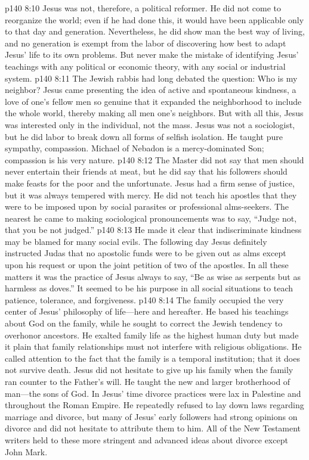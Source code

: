 \vs p140 8:10 Jesus was not, therefore, a political reformer. He did not come to reorganize the world; even if he had done this, it would have been applicable only to that day and generation. Nevertheless, he did show man the best way of living, and no generation is exempt from the labor of discovering how best to adapt Jesus’ life to its own problems. But never make the mistake of identifying Jesus’ teachings with any political or economic theory, with any social or industrial system.
\pc \vs p140 8:11 \bibnobreakspace {} The Jewish rabbis had long debated the question: Who is my neighbor? Jesus came presenting the idea of active and spontaneous kindness, a love of one’s fellow men so genuine that it expanded the neighborhood to include the whole world, thereby making all men one’s neighbors. But with all this, Jesus was interested only in the individual, not the mass. Jesus was not a sociologist, but he did labor to break down all forms of selfish isolation. He taught pure sympathy, compassion. Michael of Nebadon is a mercy\hyp{}dominated Son; compassion is his very nature.
\vs p140 8:12 The Master did not say that men should never entertain their friends at meat, but he did say that his followers should make feasts for the poor and the unfortunate. Jesus had a firm sense of justice, but it was always tempered with mercy. He did not teach his apostles that they were to be imposed upon by social parasites or professional alms\hyp{}seekers. The nearest he came to making sociological pronouncements was to say, \textcolor{ubdarkred}{“Judge not, that you be not judged.”}
\vs p140 8:13 He made it clear that indiscriminate kindness may be blamed for many social evils. The following day Jesus definitely instructed Judas that no apostolic funds were to be given out as alms except upon his request or upon the joint petition of two of the apostles. In all these matters it was the practice of Jesus always to say, \textcolor{ubdarkred}{“Be as wise as serpents but as harmless as doves.”} It seemed to be his purpose in all social situations to teach patience, tolerance, and forgiveness.
\vs p140 8:14 The family occupied the very center of Jesus’ philosophy of life---here and hereafter. He based his teachings about God on the family, while he sought to correct the Jewish tendency to overhonor ancestors. He exalted family life as the highest human duty but made it plain that family relationships must not interfere with religious obligations. He called attention to the fact that the family is a temporal institution; that it does not survive death. Jesus did not hesitate to give up his family when the family ran counter to the Father’s will. He taught the new and larger brotherhood of man---the sons of God. In Jesus’ time divorce practices were lax in Palestine and throughout the Roman Empire. He repeatedly refused to lay down laws regarding marriage and divorce, but many of Jesus’ early followers had strong opinions on divorce and did not hesitate to attribute them to him. All of the New Testament writers held to these more stringent and advanced ideas about divorce except John Mark.
